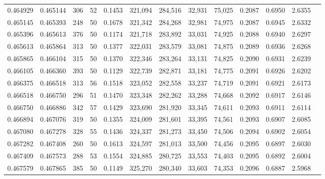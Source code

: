 \begin{tabular}{rrrrrrrrrrrrr}
0.464929 & 0.465144 &   306 &  52 &                                     0.1453 & 321,094 & 284,516 &  32,931 &  75,025 & 0.2087 & 0.6950 & 2.6355 \\
0.465145 & 0.465393 &   248 &  50 &                                     0.1678 & 321,342 & 284,268 &  32,981 &  74,975 & 0.2087 & 0.6945 & 2.6332 \\
0.465396 & 0.465613 &   376 &  50 &                                     0.1174 & 321,718 & 283,892 &  33,031 &  74,925 & 0.2088 & 0.6940 & 2.6297 \\
0.465613 & 0.465864 &   313 &  50 &                                     0.1377 & 322,031 & 283,579 &  33,081 &  74,875 & 0.2089 & 0.6936 & 2.6268 \\
0.465865 & 0.466104 &   315 &  50 &                                     0.1370 & 322,346 & 283,264 &  33,131 &  74,825 & 0.2090 & 0.6931 & 2.6239 \\
0.466105 & 0.466360 &   393 &  50 &                                     0.1129 & 322,739 & 282,871 &  33,181 &  74,775 & 0.2091 & 0.6926 & 2.6202 \\
0.466375 & 0.466518 &   313 &  56 &                                     0.1518 & 323,052 & 282,558 &  33,237 &  74,719 & 0.2091 & 0.6921 & 2.6173 \\
0.466518 & 0.466750 &   296 &  51 &                                     0.1470 & 323,348 & 282,262 &  33,288 &  74,668 & 0.2092 & 0.6917 & 2.6146 \\
0.466750 & 0.466886 &   342 &  57 &                                     0.1429 & 323,690 & 281,920 &  33,345 &  74,611 & 0.2093 & 0.6911 & 2.6114 \\
0.466894 & 0.467076 &   319 &  50 &                                     0.1355 & 324,009 & 281,601 &  33,395 &  74,561 & 0.2093 & 0.6907 & 2.6085 \\
0.467080 & 0.467278 &   328 &  55 &                                     0.1436 & 324,337 & 281,273 &  33,450 &  74,506 & 0.2094 & 0.6902 & 2.6054 \\
0.467282 & 0.467408 &   260 &  50 &                                     0.1613 & 324,597 & 281,013 &  33,500 &  74,456 & 0.2095 & 0.6897 & 2.6030 \\
0.467409 & 0.467573 &   288 &  53 &                                     0.1554 & 324,885 & 280,725 &  33,553 &  74,403 & 0.2095 & 0.6892 & 2.6004 \\
0.467579 & 0.467865 &   385 &  50 &                                     0.1149 & 325,270 & 280,340 &  33,603 &  74,353 & 0.2096 & 0.6887 & 2.5968 \\

\end{tabular}
